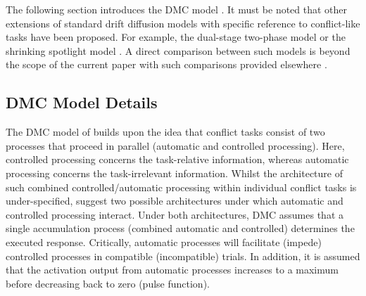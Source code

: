The following section introduces the DMC model \textcite{ulrich2015automatic}.
It must be noted that other extensions of standard drift diffusion models with
specific reference to conflict-like tasks have been proposed. For example, the
dual-stage two-phase model \parencite[DSTP, ][]{hubner2010dual} or the shrinking
spotlight model \parencite[SSP, ][]{white2011diffusion}. A direct comparison
between such models is beyond the scope of the current paper with such
comparisons provided elsewhere \parencite[see][albeit with specific reference
to the flanker task only]{white2018testing, evans2020comparison}.

\subsection{DMC Model Details} 
\label{model_details} 

The DMC model of \textcite{ulrich2015automatic} builds upon the idea that
conflict tasks consist of two processes that proceed in parallel (automatic and
controlled processing). Here, controlled processing concerns the task-relative
information, whereas automatic processing concerns the task-irrelevant
information. Whilst the architecture of such combined controlled/automatic
processing within individual conflict tasks is under-specified,
\textcite{ulrich2015automatic} suggest two possible architectures
\parencite[see Figure 1 in ][]{ulrich2015automatic} under which automatic and
controlled processing interact. Under both architectures, DMC assumes that a
single accumulation process (combined automatic and controlled) determines the
executed response. Critically, automatic processes will facilitate (impede)
controlled processes in compatible (incompatible) trials. In addition, it is
assumed that the activation output from automatic processes increases to a
maximum before decreasing back to zero (pulse function).


